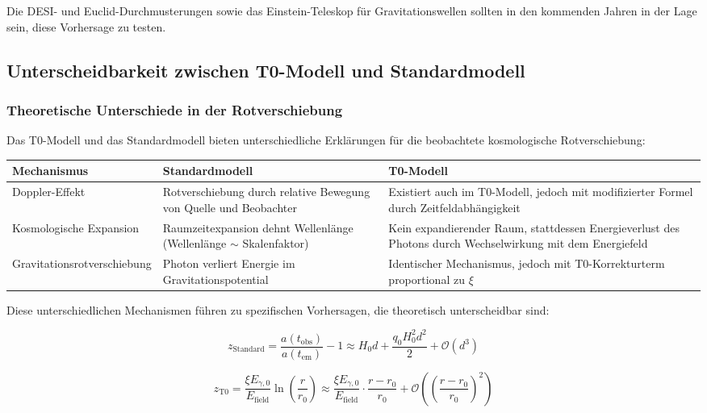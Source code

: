 \documentclass[12pt,a4paper]{article}
\theoremstyle{definition}
\begin{document}
Die DESI- und Euclid-Durchmusterungen sowie das Einstein-Teleskop für Gravitationswellen sollten in den kommenden Jahren in der Lage sein, diese Vorhersage zu testen.\subsection{Unterscheidbarkeit zwischen T0-Modell und Standardmodell}

\subsubsection{Theoretische Unterschiede in der Rotverschiebung}

Das T0-Modell und das Standardmodell bieten unterschiedliche Erklärungen für die beobachtete kosmologische Rotverschiebung:

\begin{center}
	\begin{tabular}{|p{3.5cm}|p{5.5cm}|p{5.5cm}|}
		\hline
		\textbf{Mechanismus} & \textbf{Standardmodell} & \textbf{T0-Modell} \\
		\hline
		Doppler-Effekt & Rotverschiebung durch relative Bewegung von Quelle und Beobachter & Existiert auch im T0-Modell, jedoch mit modifizierter Formel durch Zeitfeldabhängigkeit \\
		\hline
		Kosmologische Expansion & Raumzeitexpansion dehnt Wellenlänge (Wellenlänge $\sim$ Skalenfaktor) & Kein expandierender Raum, stattdessen Energieverlust des Photons durch Wechselwirkung mit dem Energiefeld \\
		\hline
		Gravitationsrotverschiebung & Photon verliert Energie im Gravitationspotential & Identischer Mechanismus, jedoch mit T0-Korrekturterm proportional zu $\xi$ \\
		\hline
	\end{tabular}
\end{center}

Diese unterschiedlichen Mechanismen führen zu spezifischen Vorhersagen, die theoretisch unterscheidbar sind:

\begin{equation}
	z_{\text{Standard}} = \frac{a(t_{\text{obs}})}{a(t_{\text{em}})} - 1 \approx H_0 d + \frac{q_0 H_0^2 d^2}{2} + \mathcal{O}(d^3)
\end{equation}

\begin{equation}
	z_{\text{T0}} = \frac{\xi E_{\gamma,0}}{E_{\text{field}}} \ln\left(\frac{r}{r_0}\right) \approx \frac{\xi E_{\gamma,0}}{E_{\text{field}}} \cdot \frac{r - r_0}{r_0} + \mathcal{O}\left(\left(\frac{r-r_0}{r_0}\right)^2\right)
\end{equation}
\end{document}
